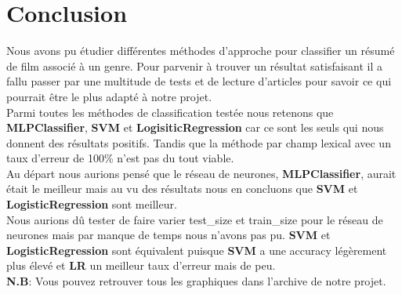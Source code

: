 \section{Conclusion}

Nous avons pu étudier différentes méthodes d'approche pour classifier un résumé de film associé à un genre. Pour parvenir à trouver un résultat satisfaisant il a fallu passer par une multitude de tests et de lecture d’articles pour savoir ce qui pourrait être le plus adapté à notre projet. \\

Parmi toutes les méthodes de classification testée nous retenons que \textbf{MLPClassifier}, \textbf{SVM} et \textbf{LogisiticRegression} car ce sont les seuls qui nous donnent des résultats positifs. Tandis que la méthode par champ lexical avec un taux d'erreur de 100\% n'est pas du tout viable. \\

Au départ nous aurions pensé que le réseau de neurones, \textbf{MLPClassifier}, aurait était le meilleur mais au vu des résultats nous en concluons que \textbf{SVM} et \textbf{LogisticRegression} sont meilleur. \\
Nous aurions dû tester de faire varier test\_size et train\_size pour le réseau de neurones mais par manque de temps nous n'avons pas pu.
\textbf{SVM} et \textbf{LogisticRegression} sont équivalent puisque \textbf{SVM} a une accuracy légèrement plus élevé et \textbf{LR} un meilleur taux d'erreur mais de peu. \\

\textbf{N.B}: Vous pouvez retrouver tous les graphiques dans l'archive de notre projet.